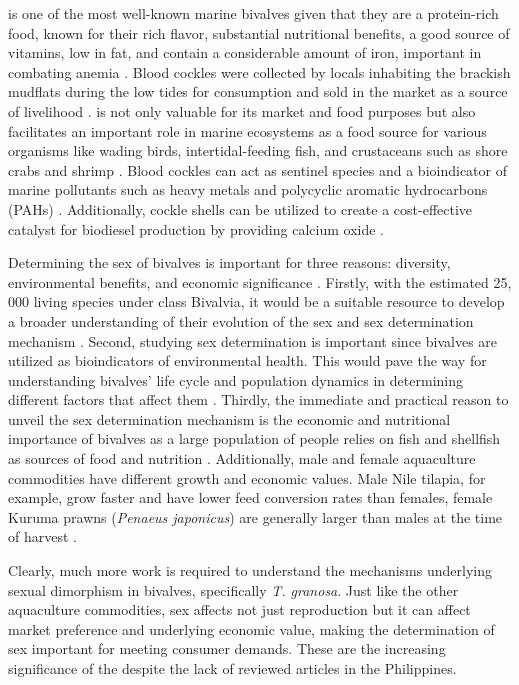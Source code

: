 \Tgranosa is one of the most well-known marine bivalves given that they are a protein-rich food, known for their rich flavor, substantial nutritional benefits, a good source of vitamins, low in fat, and contain a considerable amount of iron, important in combating anemia \cite{zha2022}. Blood cockles were collected by locals inhabiting the brackish mudflats during the low tides for consumption and sold in the market as a source of livelihood \cite{miranda2023}. \Tgranosa is not only valuable for its market and food purposes but also facilitates an important role in marine ecosystems as a food source for various organisms like wading birds, intertidal-feeding fish, and crustaceans such as shore crabs and shrimp \cite{burdon2014}. Blood cockles can act as sentinel species and a bioindicator of marine pollutants such as heavy metals \cite{ishak2016} and polycyclic aromatic hydrocarbons (PAHs) \cite{sany2014}. Additionally, cockle shells can be utilized to create a cost-effective catalyst for biodiesel production by providing calcium oxide \cite{boey2011waste}.

Determining the sex of bivalves is important for three reasons: diversity, environmental benefits, and economic significance \cite{breton2010novel}. Firstly, with the estimated 25, 000 living species under class Bivalvia, it would be a suitable resource to develop a broader understanding of their evolution of the sex and sex determination mechanism  \cite{breton2010novel}. Second, studying sex determination is important since bivalves are utilized as bioindicators of environmental health. This would pave the way for understanding bivalves' life cycle and population dynamics in determining different factors that affect them \cite{campos2012}. Thirdly, the immediate and practical reason to unveil the sex determination mechanism is the economic and nutritional importance of bivalves as a large population of people relies on fish and shellfish as sources of food and nutrition \cite{naylor2000}. Additionally, male and female aquaculture commodities have different growth and economic values. Male Nile tilapia, for example, grow faster and have lower feed conversion rates than females, female Kuruma prawns (\textit{Penaeus japonicus}) are generally larger than males at the time of harvest \cite{budd}. 

Clearly, much more work is required to understand the mechanisms underlying sexual dimorphism in bivalves, specifically \textit{T. granosa}. Just like the other aquaculture commodities, sex affects not just reproduction but it can affect market preference and underlying economic value, making the determination of sex important for meeting consumer demands. These are the increasing significance of the \Tgranosa despite the lack of reviewed articles in the Philippines.

